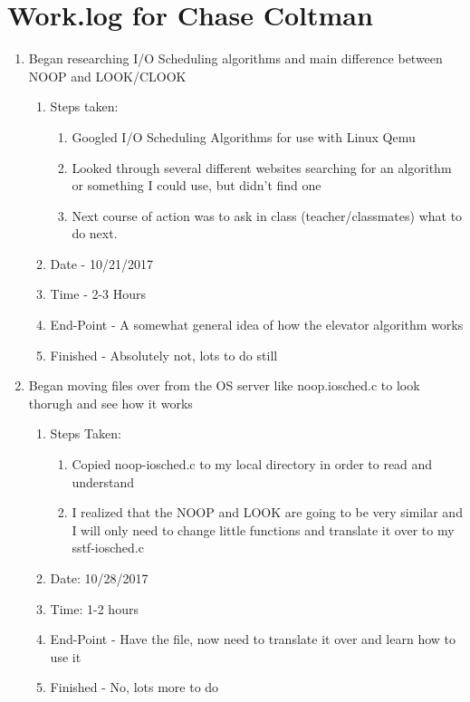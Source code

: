 \documentclass[journal,10pt,onecolumn,compsoc]{IEEEtran} \usepackage[margin=1.0in]{geometry} \usepackage{pdfpages}
\begin{document}
\section{Work.log for Chase Coltman}
	\begin {enumerate}
    	\item Began researching I/O Scheduling algorithms and main difference between NOOP and LOOK/CLOOK
        \begin{enumerate}
            \item Steps taken:
        	\begin{enumerate}
                  \item Googled I/O Scheduling Algorithms for use with Linux Qemu
                  \item Looked through several different websites searching for an algorithm or something I could use, but didn't find one
                  \item Next course of action was to ask in class (teacher/classmates) what to do next.
     		\end{enumerate}   
            \item Date - 10/21/2017
            \item Time - 2-3 Hours
            \item End-Point - A somewhat general idea of how the elevator algorithm works
            \item Finished - Absolutely not, lots to do still  \\
        \end{enumerate}
    	
        \item Began moving files over from the OS server like noop.iosched.c to look thorugh and see how it works
        	\begin {enumerate}
            	\item Steps Taken: 
                	\begin{enumerate}
                    	\item Copied noop-iosched.c to my local directory in order to read and understand
                        \item I realized that the NOOP and LOOK are going to be very similar and I will only need to change little functions and translate it over to my sstf-iosched.c
                    \end{enumerate}
                \item Date: 10/28/2017
                \item Time: 1-2 hours 
                \item End-Point - Have the file, now need to translate it over and learn how to use it
                \item Finished - No, lots more to do
        	\end {enumerate}
    

\end{enumerate}
\end{document}
